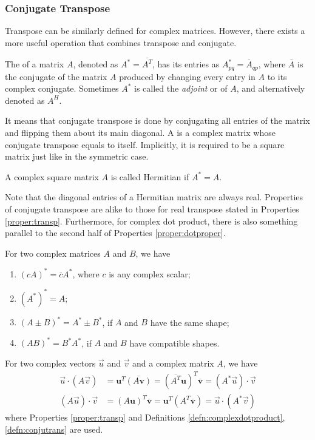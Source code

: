 \subsubsection{Conjugate Transpose}
Transpose can be similarly defined for complex matrices. However, there exists a more useful operation that combines transpose and conjugate.
\begin{defn}
\label{defn:conjutrans}
The  of a matrix $A$, denoted as $A^* = \overline{A^T}$, has its entries as $A^*_{pq} = \overline{A}_{qp}$, where $\overline{A}$ is the conjugate of the matrix $A$ produced by changing every entry in $A$ to its complex conjugate. Sometimes $A^*$ is called the \textit{adjoint} or  of $A$, and alternatively denoted as $A^H$. 
\end{defn}
It means that conjugate transpose is done by conjugating all entries of the matrix and flipping them about its main diagonal. A  is a complex matrix whose conjugate transpose equals to itself. Implicitly, it is required to be a square matrix just like in the symmetric case.
\begin{defn}
\label{defn:Hermitian}
A complex square matrix $A$ is called Hermitian if $A^* = A$.
\end{defn}
Note that the diagonal entries of a Hermitian matrix are always real. Properties of conjugate transpose are alike to those for real transpose stated in Properties \ref{proper:transp}. Furthermore, for complex dot product, there is also something parallel to the second half of Properties \ref{proper:dotproper}.
\begin{proper}
\label{proper:complexmat}
For two complex matrices $A$ and $B$, we have
\begin{enumerate}
\item $(cA)^* = \overline{c}A^*$, where $c$ is any complex scalar;
\item $(A^*)^* = A$;
\item $(A \pm B)^* = A^* \pm B^*$, if $A$ and $B$ have the same shape;
\item $(AB)^* = B^*A^*$, if $A$ and $B$ have compatible shapes.
\end{enumerate}
\end{proper}
\begin{proper}
\label{proper:complexdotherm}
For two complex vectors $\vec{u}$ and $\vec{v}$ and a complex matrix $A$, we have 
\begin{align*}
\vec{u} \cdot (A\vec{v}) &= \textbf{u}^T\overline{(A\textbf{v})} = (\overline{A^T}\textbf{u})^T\overline{\textbf{v}} = (A^*\vec{u}) \cdot \vec{v} \\
(A\vec{u}) \cdot \vec{v} &= (A\textbf{u})^T\overline{\textbf{v}} = \textbf{u}^T(A^T\overline{\textbf{v}}) = \vec{u} \cdot (A^*\vec{v})
\end{align*}
where Properties \ref{proper:transp} and Definitions \ref{defn:complexdotproduct}, \ref{defn:conjutrans} are used.
\end{proper}

